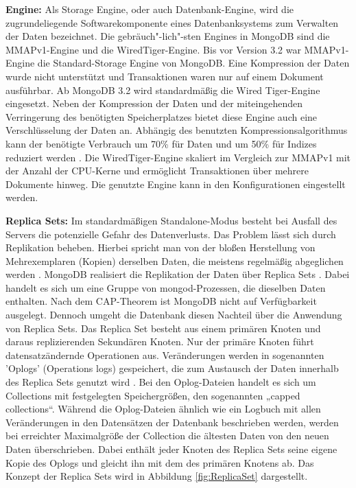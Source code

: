 \noindent
{}
\textbf{Engine:}
Als Storage Engine, oder auch Datenbank-Engine, wird die zugrundeliegende Softwarekomponente eines Datenbanksystems zum Verwalten der Daten bezeichnet. Die gebräuch"-lich"-sten Engines in MongoDB sind die MMAPv1-Engine und die WiredTiger-Engine.\newline
Bis vor Version 3.2 war MMAPv1-Engine die Standard-Storage Engine von MongoDB. Eine Kompression der Daten wurde nicht unterstützt und Transaktionen waren nur auf einem Dokument ausführbar. Ab MongoDB 3.2 wird standardmäßig die Wired Tiger-Engine eingesetzt. Neben der Kompression der Daten und der miteingehenden Verringerung des benötigten Speicherplatzes bietet diese Engine auch eine Verschlüsselung der Daten an. Abhängig des benutzten Kompressionsalgorithmus kann der benötigte Verbrauch um 70\% für Daten und um 50\% für Indizes reduziert werden \cite{DB3.5}. Die WiredTiger-Engine skaliert im Vergleich zur MMAPv1 mit der Anzahl der CPU-Kerne und ermöglicht Transaktionen über mehrere Dokumente hinweg. Die genutzte Engine kann in den Konfigurationen eingestellt werden.
\newline

\noindent
{}
\textbf{Replica Sets:}
Im standardmäßigen Standalone-Modus besteht bei Ausfall des Servers die potenzielle Gefahr des Datenverlusts. Das Problem lässt sich durch Replikation beheben. Hierbei spricht man von der bloßen Herstellung von Mehrexemplaren (Kopien) derselben Daten, die meistens regelmäßig abgeglichen werden \cite{DB3.6}. MongoDB realisiert die Replikation der Daten über Replica Sets \cite{DB3.7}. Dabei handelt es sich um eine Gruppe von mongod-Prozessen, die dieselben Daten enthalten. Nach dem CAP-Theorem ist MongoDB nicht auf Verfügbarkeit ausgelegt. Dennoch umgeht die Datenbank diesen Nachteil über die Anwendung von Replica Sets. Das Replica Set besteht aus einem primären Knoten und daraus replizierenden Sekundären Knoten.
Nur der primäre Knoten führt datensatzändernde Operationen aus. Veränderungen werden in sogenannten 'Oplogs' (Operations logs) gespeichert, die zum Austausch der Daten innerhalb des Replica Sets genutzt wird \cite{DB3.8}. Bei den Oplog-Dateien handelt es sich um Collections mit festgelegten Speichergrößen, den sogenannten „capped collections“. Während die Oplog-Dateien ähnlich wie ein Logbuch mit allen Veränderungen in den Datensätzen der Datenbank beschrieben werden, werden bei erreichter Maximalgröße der Collection die ältesten Daten von den neuen Daten überschrieben. Dabei enthält jeder Knoten des Replica Sets seine eigene Kopie des Oplogs und gleicht ihn mit dem des primären Knotens ab. Das Konzept der Replica Sets wird in Abbildung \ref{fig:ReplicaSet} dargestellt. \\

